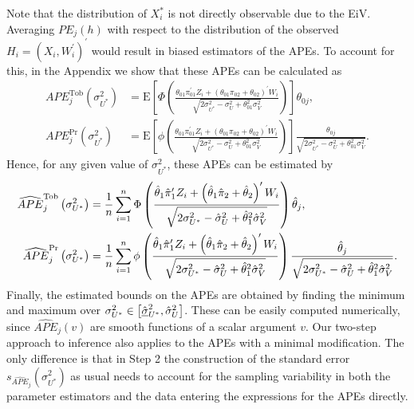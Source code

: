 \documentclass[12pt]{article}
\begin{document}
Note that the distribution of $X_{i}^{\ast }$ is not directly observable due
to the EiV. Averaging $PE_{j}\left( h\right) $ with respect to the
distribution of the observed $H_{i}=\left( X_{i},W_{i}^{\prime }\right)
^{\prime }$ would result in biased estimators of the APEs. To account for
this, in the Appendix we show that these APEs can be calculated as%
\begin{align}
APE_{j}^{\text{Tob}}\left( \sigma _{U^{\ast }}^{2}\right) & =\mathrm{E}\left[
\Phi \left( \frac{\theta _{01}\pi _{01}^{\prime }Z_{i}+\left( \theta
_{01}\pi _{02}+\theta _{02}\right) ^{\prime }W_{i}}{\sqrt{2\sigma _{U^{\ast
}}^{2}-\sigma _{U}^{2}+\theta _{01}^{2}\sigma _{V}^{2}}}\right) \right]
\theta _{0j},  \label{eq:true APE Tobit} \\
APE_{j}^{\Pr }\left( \sigma _{U^{\ast }}^{2}\right) & =\mathrm{E}\left[ \phi
\left( \frac{\theta _{01}\pi _{01}^{\prime }Z_{i}+\left( \theta _{01}\pi
_{02}+\theta _{02}\right) ^{\prime }W_{i}}{\sqrt{2\sigma _{U^{\ast
}}^{2}-\sigma _{U}^{2}+\theta _{01}^{2}\sigma _{V}^{2}}}\right) \right] 
\frac{\theta _{0j}}{\sqrt{2\sigma _{U^{\ast }}^{2}-\sigma _{U}^{2}+\theta
_{01}^{2}\sigma _{V}^{2}}}.  \label{eq:true APE Probit}
\end{align}%
Hence, for any given value of $\sigma _{U^{\ast }}^{2}$, these APEs can be
estimated by%
\begin{align*}
\widehat{APE}_{j}^{\text{Tob}}\left( \sigma _{U^{\ast }}^{2}\right) & =\frac{%
1}{n}\sum_{i=1}^{n}\Phi \left( \frac{\hat{\theta}_{1}\hat{\pi}_{1}^{\prime
}Z_{i}+\left( \hat{\theta}_{1}\hat{\pi}_{2}+\hat{\theta}_{2}\right) ^{\prime
}W_{i}}{\sqrt{2\sigma _{U^{\ast }}^{2}-\hat{\sigma}_{U}^{2}+\hat{\theta}%
_{1}^{2}\hat{\sigma}_{V}^{2}}}\right) \hat{\theta}_{j}, \\
\widehat{APE}_{j}^{\Pr }\left( \sigma _{U^{\ast }}^{2}\right) & =\frac{1}{n}%
\sum_{i=1}^{n}\phi \left( \frac{\hat{\theta}_{1}\hat{\pi}_{1}^{\prime
}Z_{i}+\left( \hat{\theta}_{1}\hat{\pi}_{2}+\hat{\theta}_{2}\right) ^{\prime
}W_{i}}{\sqrt{2\sigma _{U^{\ast }}^{2}-\hat{\sigma}_{U}^{2}+\hat{\theta}%
_{1}^{2}\hat{\sigma}_{V}^{2}}}\right) \frac{\hat{\theta}_{j}}{\sqrt{2\sigma
_{U^{\ast }}^{2}-\hat{\sigma}_{U}^{2}+\hat{\theta}_{1}^{2}\hat{\sigma}%
_{V}^{2}}}.
\end{align*}%
Finally, the estimated bounds on the APEs are obtained by finding the
minimum and maximum over $\sigma _{U^{\ast }}^{2}\in \left[ \hat{\underline{%
\sigma }}_{U^{\ast }}^{2},\hat{\sigma}_{U}^{2}\right] $. These can be easily
computed numerically, since $\widehat{APE}_{j}\left( v\right) $ are smooth
functions of a scalar argument $v$. Our two-step approach to inference also
applies to the APEs with a minimal modification. The only difference is that
in Step 2 the construction of the standard error $s_{\widehat{APE}%
_{j}}\left( \sigma _{U^{\ast }}^{2}\right) $ as usual needs to account for
the sampling variability in both the parameter estimators and the data
entering the expressions for the APEs directly.
\end{document}
